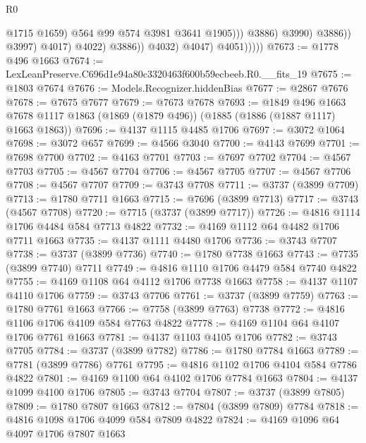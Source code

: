 \begin{lexlean}{R0}
\begin{coremodule}
                                            @1715
                                            @1659)
                                          @564
                                          @99
                                          @574
                                          @3981
                                          @3641
                                          @1905)))
                                    @3886)
                                  @3990)
                                @3886))
                            @3997)
                          @4017)
                        @4022)
                      @3886))
                  @4032)
                @4047)
              @4051)))))
@7673 := @1778 @496 @1663
@7674 := LexLeanPreserve.C696d1e94a80c3320463f600b59ecbeeb.R0.__fits_19
@7675 := @1803 @7674
@7676 := Models.Recognizer.hiddenBias
@7677 := @2867 @7676
@7678 := @7675 @7677
@7679 := @7673 @7678
@7693 := @1849
    @496
    @1663
    @7678
    @1117
    @1863
    (@1869 (@1879 @496))
    (@1885 (@1886 (@1887 @1117) @1663 @1863))
@7696 := @4137 @1115 @4485 @1706
@7697 := @3072 @1064
@7698 := @3072 @657
@7699 := @4566 @3040
@7700 := @4143 @7699
@7701 := @7698 @7700
@7702 := @4163 @7701
@7703 := @7697 @7702
@7704 := @4567 @7703
@7705 := @4567 @7704
@7706 := @4567 @7705
@7707 := @4567 @7706
@7708 := @4567 @7707
@7709 := @3743 @7708
@7711 := @3737 (@3899 @7709)
@7713 := @1780 @7711 @1663
@7715 := @7696 (@3899 @7713)
@7717 := @3743 (@4567 @7708)
@7720 := @7715 (@3737 (@3899 @7717))
@7726 := @4816 @1114 @1706 @4484 @584 @7713 @4822
@7732 := @4169 @1112 @64 @4482 @1706 @7711 @1663
@7735 := @4137 @1111 @4480 @1706
@7736 := @3743 @7707
@7738 := @3737 (@3899 @7736)
@7740 := @1780 @7738 @1663
@7743 := @7735 (@3899 @7740) @7711
@7749 := @4816 @1110 @1706 @4479 @584 @7740 @4822
@7755 := @4169 @1108 @64 @4112 @1706 @7738 @1663
@7758 := @4137 @1107 @4110 @1706
@7759 := @3743 @7706
@7761 := @3737 (@3899 @7759)
@7763 := @1780 @7761 @1663
@7766 := @7758 (@3899 @7763) @7738
@7772 := @4816 @1106 @1706 @4109 @584 @7763 @4822
@7778 := @4169 @1104 @64 @4107 @1706 @7761 @1663
@7781 := @4137 @1103 @4105 @1706
@7782 := @3743 @7705
@7784 := @3737 (@3899 @7782)
@7786 := @1780 @7784 @1663
@7789 := @7781 (@3899 @7786) @7761
@7795 := @4816 @1102 @1706 @4104 @584 @7786 @4822
@7801 := @4169 @1100 @64 @4102 @1706 @7784 @1663
@7804 := @4137 @1099 @4100 @1706
@7805 := @3743 @7704
@7807 := @3737 (@3899 @7805)
@7809 := @1780 @7807 @1663
@7812 := @7804 (@3899 @7809) @7784
@7818 := @4816 @1098 @1706 @4099 @584 @7809 @4822
@7824 := @4169 @1096 @64 @4097 @1706 @7807 @1663

\end{coremodule}
\end{lexlean}
